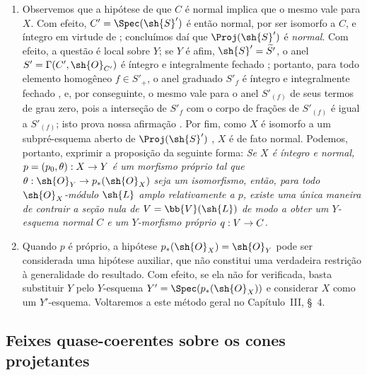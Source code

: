 \documentclass[oneside,10pt]{amsart}
\makeatletter
\newcommand{\ega@arrow}[2]{\mathchoice{#1}{#2}{#2}{#2}}
\renewcommand{\to}{\ega@arrow{\longrightarrow}{\rightarrow}}
\let\EGAOriginalLabel\label
\renewcommand{\label}[1]{\phantomsection\EGAOriginalLabel{#1}}
\makeatother
\begin{document}
\begin{remarks}[8.11.8]
\label{II.8.11.8}
\begin{enumerate}
  \item[\rm{(i)}] Observemos que a hipótese de que $C$ é normal implica que o mesmo vale para $X$.
  Com efeito, $C'=\Spec(\sh{S}')$ é então normal, por ser isomorfo a $C$, e íntegro em virtude de ;
  concluímos daí que $\Proj(\sh{S}')$ é \emph{normal}.
  Com efeito, a questão é local sobre $Y$;
  se $Y$ é afim, $\sh{S}'=\widetilde{S'}$, o anel $S'=\Gamma(C',\sh{O}_{C'})$ é íntegro e integralmente fechado ; portanto, para todo elemento homogêneo $f\in S'_+$, o anel graduado $S'_f$ é íntegro e integralmente fechado \cite[t.~I, p.~257 e 261]{I-13}, e, por conseguinte, o mesmo vale para o anel $S'_{(f)}$ de seus termos de grau zero, pois a interseção de $S'_f$ com o corpo de frações de $S'_{(f)}$ é igual a $S'_{(f)}$;
  isto prova nossa afirmação .
  Por fim, como $X$ é isomorfo a um subpré-esquema aberto de $\Proj(\sh{S}')$ , $X$ é de fato normal.
  Podemos, portanto, exprimir a proposição  da seguinte forma:
  \emph{Se $X$ é íntegro e normal, $p=(p_0,\theta):X\to Y$ é um morfismo próprio tal que $\theta:\sh{O}_Y\to p_*(\sh{O}_X)$ seja um isomorfismo, então, para todo $\sh{O}_X$-módulo $\sh{L}$ amplo relativamente a $p$, existe uma única maneira de contrair a seção nula de $V=\bb{V}(\sh{L})$ de modo a obter um $Y$-esquema normal $C$ e um $Y$-morfismo próprio $q:V\to C$.}
  \item[\rm{(ii)}] Quando $p$ é próprio, a hipótese $p_*(\sh{O}_X)=\sh{O}_Y$ pode ser considerada uma hipótese auxiliar, que não constitui uma verdadeira restrição à generalidade do resultado.
  Com efeito, se ela não for verificada, basta substituir $Y$ pelo $Y$-esquema $Y'=\Spec(p_*(\sh{O}_X))$ e considerar $X$ como um $Y'$-esquema.
  Voltaremos a este método geral no Capítulo~III, \S~4.
\end{enumerate}
\end{remarks}

\subsection{Feixes quase-coerentes sobre os cones projetantes}
\label{subsection:II.8.12}
\end{document}

